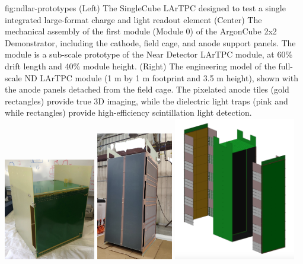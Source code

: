 \begin{dunefigure}{fig:ndlar-prototypes}
{(Left) The SingleCube LArTPC designed to test a single integrated large-format charge and light readout element (Center) The mechanical assembly of the first module (Module 0) of the ArgonCube 2x2 Demonstrator, including the cathode, field cage, and anode support panels.  The module is a sub-scale prototype of the Near Detector LArTPC module, at 60\% drift length and 40\% module height.  (Right) The engineering model of the full-scale ND LArTPC module (1 m by 1 m footprint and 3.5 m height), shown with the anode panels detached from the field cage.  The pixelated anode tiles (gold rectangles) provide true 3D imaging, while the dielectric light traps (pink and while rectangles) provide high-efficiency scintillation light detection.}
\includegraphics[width=0.3\textwidth]{graphics/lartpc/Prototyping/SingleCubeTPC.png}
\includegraphics[width=0.25\textwidth]{graphics/lartpc/Prototyping/Module_0_FieldCage.png}
\includegraphics[width=0.4\textwidth]{graphics/lartpc/Prototyping/assemblysinglemod.PNG}
\end{dunefigure}

